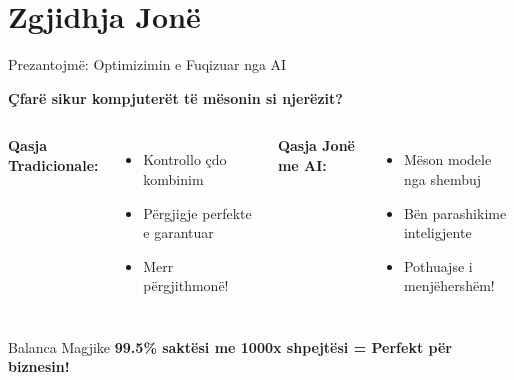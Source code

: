 \documentclass[aspectratio=169]{beamer}
\begin{document}

\section{Zgjidhja Jonë}

\begin{frame}{Prezantojmë: Optimizimin e Fuqizuar nga AI}
\begin{center}
\Large \textbf{Çfarë sikur kompjuterët të mësonin si njerëzit?}
\end{center}

\vspace{0.5cm}

\begin{columns}
\textbf{Qasja Tradicionale:}
\begin{itemize}
    \item Kontrollo çdo kombinim
    \item Përgjigje perfekte e garantuar
    \item \textcolor{aired}{Merr përgjithmonë!}
\end{itemize}

\vspace{0.3cm}

\textbf{Qasja Jonë me AI:}
\begin{itemize}
    \item Mëson modele nga shembuj
    \item Bën parashikime inteligjente
    \item \textcolor{aigreen}{Pothuajse i menjëhershëm!}
\end{itemize}

\vspace{0.3cm}
\end{columns}

\vspace{0.5cm}
\begin{block}{Balanca Magjike}
\textbf{99.5\% saktësi me 1000x shpejtësi = Perfekt për biznesin!}
\end{block}
\end{frame}
\end{document}
